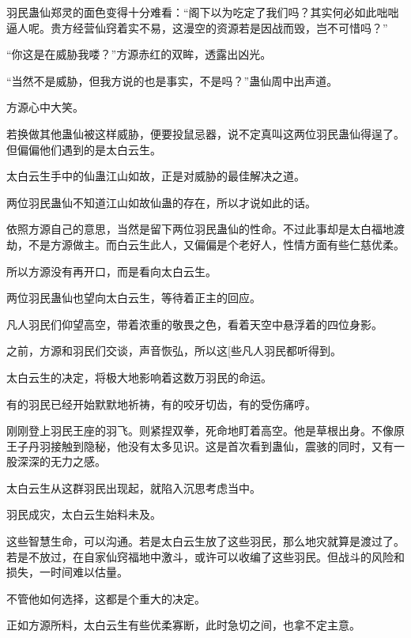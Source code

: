 
\begin{this_body}



羽民蛊仙郑灵的面色变得十分难看：“阁下以为吃定了我们吗？其实何必如此咄咄逼人呢。贵方经营仙窍着实不易，这漫空的资源若是因战而毁，岂不可惜吗？”

“你这是在威胁我喽？”方源赤红的双眸，透露出凶光。

“当然不是威胁，但我方说的也是事实，不是吗？”蛊仙周中出声道。

方源心中大笑。

若换做其他蛊仙被这样威胁，便要投鼠忌器，说不定真叫这两位羽民蛊仙得逞了。但偏偏他们遇到的是太白云生。

太白云生手中的仙蛊江山如故，正是对威胁的最佳解决之道。

两位羽民蛊仙不知道江山如故仙蛊的存在，所以才说如此的话。

依照方源自己的意思，当然是留下两位羽民蛊仙的性命。不过此事却是太白福地渡劫，不是方源做主。而白云生此人，又偏偏是个老好人，性情方面有些仁慈优柔。

所以方源没有再开口，而是看向太白云生。

两位羽民蛊仙也望向太白云生，等待着正主的回应。

凡人羽民们仰望高空，带着浓重的敬畏之色，看着天空中悬浮着的四位身影。

之前，方源和羽民们交谈，声音恢弘，所以这[些凡人羽民都听得到。

太白云生的决定，将极大地影响着这数万羽民的命运。

有的羽民已经开始默默地祈祷，有的咬牙切齿，有的受伤痛哼。

刚刚登上羽民王座的羽飞。则紧捏双拳，死命地盯着高空。他是草根出身。不像原王子丹羽接触到隐秘，他没有太多见识。这是首次看到蛊仙，震骇的同时，又有一股深深的无力之感。

太白云生从这群羽民出现起，就陷入沉思考虑当中。

羽民成灾，太白云生始料未及。

这些智慧生命，可以沟通。若是太白云生放了这些羽民，那么地灾就算是渡过了。若是不放过，在自家仙窍福地中激斗，或许可以收编了这些羽民。但战斗的风险和损失，一时间难以估量。

不管他如何选择，这都是个重大的决定。

正如方源所料，太白云生有些优柔寡断，此时急切之间，也拿不定主意。


\end{this_body}
